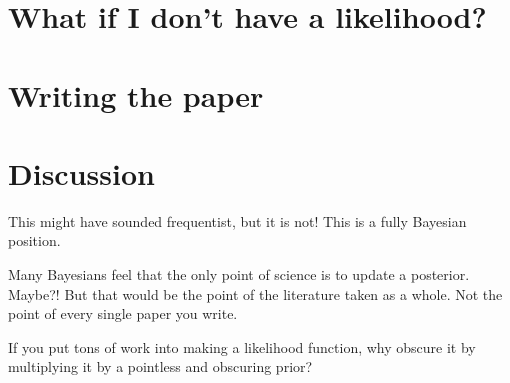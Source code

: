 \documentclass{article}
\begin{document}
\section{What if I don't have a likelihood?}\label{sec:lfi}

\section{Writing the paper}

\section{Discussion}
This might have sounded frequentist, but it is not!
This is a fully Bayesian position.

Many Bayesians feel that the only point of science is to update a posterior. Maybe?! But that would be the point of the literature taken as a whole. Not the point of every single paper you write.

If you put tons of work into making a likelihood function, why obscure it by multiplying it by a pointless and obscuring prior?
\end{document}

